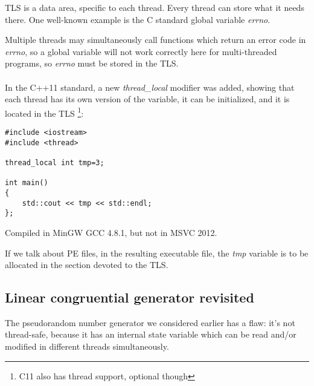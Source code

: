 \label{TLS}

TLS is a data area, specific to each thread. Every thread can store what it needs there.
One well-known example is the C standard global variable \emph{errno}. 

Multiple threads may simultaneously call functions
which return an error code in \emph{errno}, so a global variable will not work correctly here for multi-threaded programs,
so \emph{errno} must be stored in the \ac{TLS}. \\
\\
In the C++11 standard, a new \emph{thread\_local} modifier was added, showing that each thread has its own version of the variable,
it can be initialized, and it is located in the \ac{TLS}
\footnote{ C11 also has thread support, optional though}:

\begin{lstlisting}[caption=C++11,style=customc]
#include <iostream>
#include <thread>

thread_local int tmp=3;

int main()
{
	std::cout << tmp << std::endl;
};
\end{lstlisting}

Compiled in MinGW GCC 4.8.1, but not in MSVC 2012.

If we talk about PE files, in the resulting executable file, the \emph{tmp} 
variable is to be allocated in the section devoted to the \ac{TLS}.

\subsection{Linear congruential generator revisited}
\label{LCG_TLS}

The pseudorandom number generator we considered earlier  has a flaw:
it's not thread-safe, because it has an internal state variable which can be read and/or modified in different threads simultaneously.




